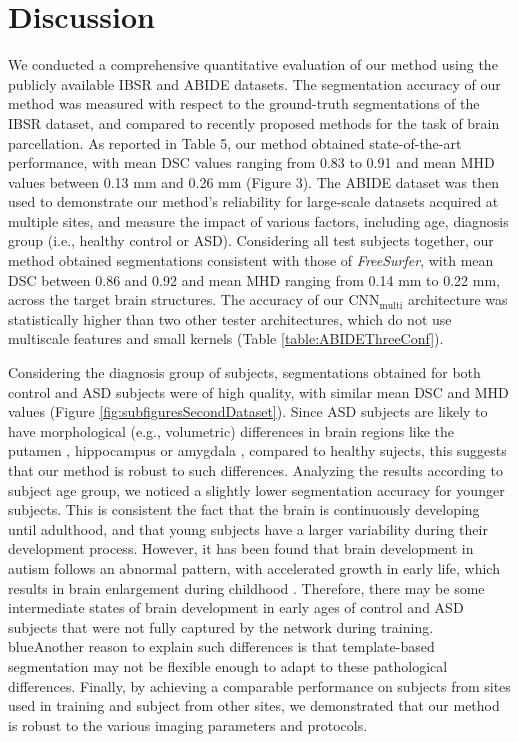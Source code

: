 \documentclass[twoside,fleqn,espcrc2]{elsarticle}
\newcommand{\CNNmulti}{\mr{CNN}_\mr{multi}}
\newcommand{\mr}[1]{\mathrm{#1}}
\newcommand{\FreeSurfer}{\textit{FreeSurfer}}
\begin{document}
\section{Discussion}
\label{sec:discussion}


We conducted a comprehensive quantitative evaluation of our method using the publicly available IBSR and ABIDE datasets. The segmentation accuracy of our method was measured with respect to the ground-truth segmentations of the IBSR dataset, and compared to recently proposed methods for the task of brain parcellation. As reported in Table 5, our method obtained state-of-the-art performance, with mean DSC values ranging from 0.83 to 0.91 and mean MHD values between 0.13 mm and 0.26 mm (Figure 3). The ABIDE dataset was then used to demonstrate our method's reliability for large-scale datasets acquired at multiple sites, and measure the impact of various factors, including age, diagnosis group (i.e., healthy control or ASD). Considering all test subjects together, our method obtained segmentations consistent with those of \FreeSurfer{}, with mean DSC between 0.86 and 0.92 and mean MHD ranging from 0.14 mm to 0.22 mm, across the target brain structures. The accuracy of our $\CNNmulti$ architecture was statistically higher than two other tester architectures, which do not use multiscale features and small kernels (Table \ref{table:ABIDEThreeConf}).



Considering the diagnosis group of subjects, segmentations obtained for both control and ASD subjects were of high quality, with similar mean DSC and MHD values (Figure \ref{fig:subfiguresSecondDataset}). Since ASD subjects are likely to have morphological (e.g., volumetric) differences in brain regions like the putamen \cite{sato2013increased}, hippocampus \cite{nicolson2006detection} or amygdala \cite{schumann2004amygdala}, compared to healthy sujects, this suggests that our method is robust to such differences. Analyzing the results according to subject age group, we noticed a slightly lower segmentation accuracy for younger subjects. This is consistent the fact that the brain is continuously developing until adulthood, and that young subjects have a larger variability during their development process. However, it has been found that brain development in autism follows an abnormal pattern, with accelerated growth in early life, which results in brain enlargement during childhood \cite{aylward2002effects}. Therefore, there may be some intermediate states of brain development in early ages of control and ASD subjects that were not fully captured by the network during training. {blue}{Another reason to explain such differences is that template-based segmentation may not be flexible enough to adapt to these pathological differences.}
Finally, by achieving a comparable performance on subjects from sites used in training and subject from other sites, we demonstrated that our method is robust to the various imaging parameters and protocols.
\end{document}
